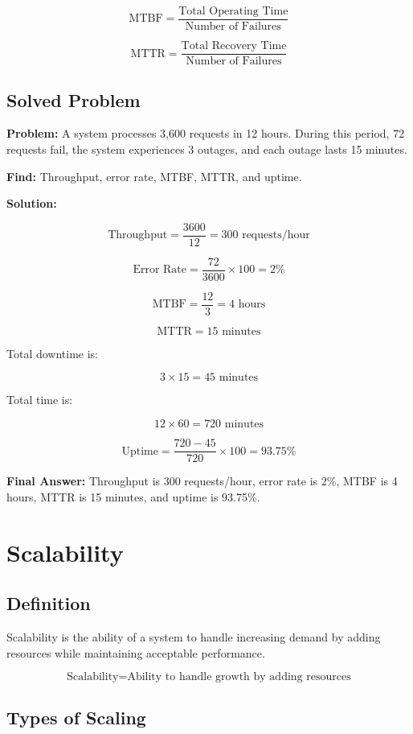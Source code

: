 \documentclass[11pt]{article}
\begin{document}
\[
\text{MTBF}
=
\frac{\text{Total Operating Time}}{\text{Number of Failures}}
\]

\[
\text{MTTR}
=
\frac{\text{Total Recovery Time}}{\text{Number of Failures}}
\]

\subsection*{Solved Problem}

\textbf{Problem:} A system processes 3,600 requests in 12 hours. During this period, 72 requests fail, the system experiences 3 outages, and each outage lasts 15 minutes.

\textbf{Find:} Throughput, error rate, MTBF, MTTR, and uptime.

\textbf{Solution:}

\[
\text{Throughput}
=
\frac{3600}{12}
=
300 \text{ requests/hour}
\]

\[
\text{Error Rate}
=
\frac{72}{3600}
\times 100
=
2\%
\]

\[
\text{MTBF}
=
\frac{12}{3}
=
4 \text{ hours}
\]

\[
\text{MTTR}
=
15 \text{ minutes}
\]

Total downtime is:

\[
3 \times 15 = 45 \text{ minutes}
\]

Total time is:

\[
12 \times 60 = 720 \text{ minutes}
\]

\[
\text{Uptime}
=
\frac{720 - 45}{720}
\times 100
=
93.75\%
\]

\textbf{Final Answer:} Throughput is 300 requests/hour, error rate is 2\%, MTBF is 4 hours, MTTR is 15 minutes, and uptime is 93.75\%.

\section{Scalability}

\subsection*{Definition}

Scalability is the ability of a system to handle increasing demand by adding resources while maintaining acceptable performance.

\[
\boxed{\text{Scalability} = \text{Ability to handle growth by adding resources}}
\]

\subsection*{Types of Scaling}
\end{document}
